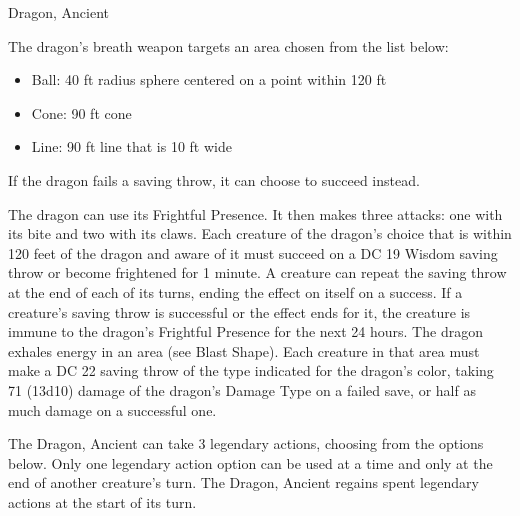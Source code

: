 \begin{DndMonster}[float*=b,width=\textwidth + 8pt]{Dragon, Ancient}
\begin{multicols}{2}
 The dragon's breath weapon targets an area chosen from the list below:
\begin{itemize}
	\item[]Ball: 40 ft radius sphere centered on a point within 120 ft
	\item[]Cone: 90 ft cone
	\item[]Line: 90 ft line that is 10 ft wide
\end{itemize}

 If the dragon fails a saving throw, it can choose to succeed instead.

 The dragon can use its Frightful Presence. It then makes three attacks: one with its bite and two with its claws.
\DndMonsterAttack[
	name=Bite,
	distance=melee,
	type=weapon,
	mod=+15,
	reach=15,
	dmg=\DndDice{2d10 + 8},
	dmg-type=piercing,
	extra={ plus 9 (2d8) damage of the dragon's Damage Type.}
]
\DndMonsterAttack[
	name=Claw,
	distance=melee,
	type=weapon,
	mod=+15,
	reach=10,
	dmg=\DndDice{2d6 + 8},
	dmg-type=slashing
]
\DndMonsterAttack[
	name=Tail,
	distance=melee,
	type=weapon,
	mod=+15,
	reach=20,
	dmg=\DndDice{2d8 + 8},
	dmg-type=bludgeoning
]
Each creature of the dragon's choice that is within 120 feet of the dragon and aware of it must succeed on a DC 19 Wisdom saving throw or become frightened for 1 minute. A creature can repeat the saving throw at the end of each of its turns, ending the effect on itself on a success. If a creature's saving throw is successful or the effect ends for it, the creature is immune to the dragon's Frightful Presence for the next 24 hours.
The dragon exhales energy in an area (see Blast Shape). Each creature in that area must make a DC 22 saving throw of the type indicated for the dragon's color, taking 71 (13d10) damage of the dragon's Damage Type on a failed save, or half as much damage on a successful one.

The Dragon, Ancient can take 3 legendary actions, choosing from the options below. Only one legendary action option can be used at a time and only at the end of another creature's turn. The Dragon, Ancient regains spent legendary actions at the start of its turn.
\begin{DndMonsterLegendaryActions}
\end{DndMonsterLegendaryActions}

\end{multicols}
\end{DndMonster}
